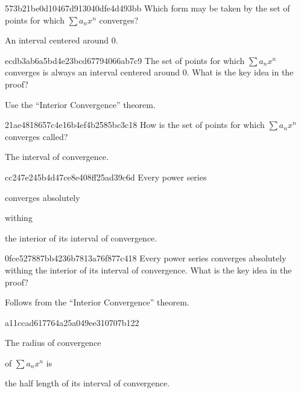 \begin{note}{573b21be0d10467d913040dfe4d493bb}
    Which form may be taken by the set of points for which \({ \sum a_n x^{n} }\) converges?

    \begin{cloze}{1}
        An interval centered around \({ 0 }\).
    \end{cloze}
\end{note}

\begin{note}{ecdb3ab6a5bd4e23bcd67794066ab7c9}
    The set of points for which \({ \sum a_n x^{n} }\) converges is always an interval centered around \({ 0 }\).
    What is the key idea in the proof?

    \begin{cloze}{1}
        Use the ``Interior Convergence'' theorem.
    \end{cloze}
\end{note}

\begin{note}{21ae4818657c4e16b4ef4b2585bc3c18}
    How is the set of points for which \({ \sum a_n x^{n} }\) converges called?

    \begin{cloze}{1}
        The interval of convergence.
    \end{cloze}
\end{note}

\begin{note}{cc247e245b4d47ce8e408ff25ad39c6d}
    Every power series \begin{icloze}{1}converges absolutely\end{icloze} withing \begin{icloze}{2}the interior of its interval of convergence.\end{icloze}
\end{note}

\begin{note}{0fce527887bb4236b7813a76f877c418}
    Every power series converges absolutely withing the interior of its interval of convergence.
    What is the key idea in the proof?

    \begin{cloze}{1}
        Follows from the ``Interior Convergence'' theorem.
    \end{cloze}
\end{note}

\begin{note}{a11ccad617764a25a049ee310707b122}
    \begin{icloze}{2}The radius of convergence\end{icloze} of \({ \sum a_n x^{n} }\) is \begin{icloze}{1}the half length of its interval of convergence.\end{icloze}
\end{note}

